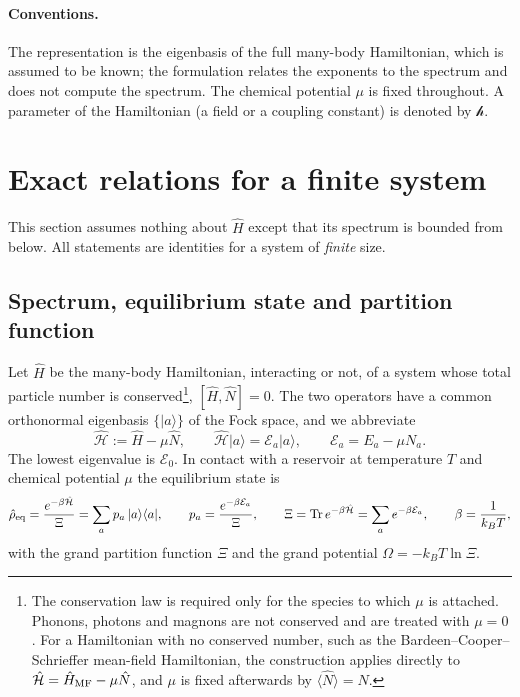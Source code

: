 \documentclass[10pt,a4paper]{article}
\theoremstyle{plain}
\newcommand{\Tr}{\operatorname{Tr}}
\newcommand{\hfield}{\mathscr{h}}  %
\newcommand{\enrg}{\mathcal{E}}  %
\begin{document}
\paragraph{Conventions.} The representation is the eigenbasis of the full
many-body Hamiltonian, which is assumed to be known; the formulation relates
the exponents to the spectrum and does not compute the spectrum. The
chemical potential $\mu$ is fixed throughout. A parameter of the Hamiltonian
(a field or a coupling constant) is denoted by $\hfield$.

\section{Exact relations for a finite system}
\label{sec:filters}
This section assumes nothing about $\hat H$ except that its spectrum is
bounded from below. All statements are identities for a system of \emph{finite}
size.

\subsection{Spectrum, equilibrium state and partition function}
\label{sec:filt_exact}\label{sec:filt_laplace}

Let $ \hat H $ be the many-body Hamiltonian, interacting or not, of a system
whose total particle number is conserved\footnote{The
conservation law is required only for the species to which $ \mu $ is
attached. Phonons, photons and magnons are not conserved and are treated
with $ \mu = 0 $. For a Hamiltonian with no conserved number, such as the
Bardeen--Cooper--Schrieffer mean-field Hamiltonian, the construction applies
directly to $ \hat{\mathcal{H}} = \hat H_{\rm MF} - \mu\hat N $, and
$ \mu $ is fixed afterwards by $ \langle\hat N\rangle = N $.},
$ [\hat H, \hat N] = 0 $. The two operators have a common orthonormal
eigenbasis $ \{|a\rangle\} $ of the Fock space, and we abbreviate
\[
  \hat{\mathcal{H}} := \hat H - \mu\hat N , \qquad
  \hat{\mathcal{H}}|a\rangle = \enrg_a|a\rangle , \qquad \enrg_a = E_a - \mu N_a .
\]
The lowest eigenvalue is $\enrg_0$. In contact with a reservoir at
temperature $T$ and chemical potential $\mu$ the equilibrium state is
\[
  \hat\rho_{\rm eq} = \frac{e^{-\beta\hat{\mathcal{H}}}}{\Xi}
  = \sum_ap_a\,|a\rangle\langle a| , \qquad
  p_a = \frac{e^{-\beta \enrg_a}}{\Xi} , \qquad
  \Xi = \Tr e^{-\beta\hat{\mathcal{H}}} = \sum_ae^{-\beta\enrg_a} , \qquad
  \beta=\frac1{k_BT} ,
\]
with the grand partition function $\Xi$ and the grand potential
$\Omega=-k_BT\ln\Xi$.
\end{document}
